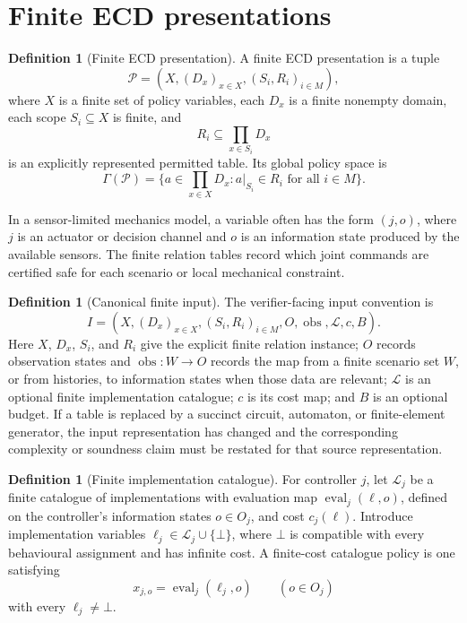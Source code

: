 \documentclass[11pt]{article}
\theoremstyle{plain}
\theoremstyle{definition}
\newtheorem{definition}[theorem]{Definition}
\theoremstyle{remark}
\begin{document}
\section{Finite ECD presentations}
\label{sec:finite-presentations}

\begin{definition}[Finite ECD presentation]
A finite ECD presentation is a tuple
\[
  \mathcal P=(X,(D_x)_{x\in X},(S_i,R_i)_{i\in M}),
\]
where \(X\) is a finite set of policy variables, each \(D_x\) is a finite
nonempty domain, each scope \(S_i\subseteq X\) is finite, and
\[
  R_i\subseteq\prod_{x\in S_i}D_x
\]
is an explicitly represented permitted table.  Its global policy space is
\[
  \Gamma(\mathcal P)=
  \{a\in\prod_{x\in X}D_x: a|_{S_i}\in R_i\text{ for all }i\in M\}.
\]
\end{definition}

In a sensor-limited mechanics model, a variable often has the form \((j,o)\),
where \(j\) is an actuator or decision channel and \(o\) is an information state
produced by the available sensors.  The finite relation tables record which
joint commands are certified safe for each scenario or local mechanical
constraint.

\begin{definition}[Canonical finite input]
\label{def:canonical-input}
The verifier-facing input convention is
\[
I=(X,(D_x)_{x\in X},(S_i,R_i)_{i\in M},O,\operatorname{obs},
\mathcal L,c,B).
\]
Here \(X\), \(D_x\), \(S_i\), and \(R_i\) give the explicit finite relation
instance; \(O\) records observation states and
\(\operatorname{obs}:W\to O\) records the map from a finite scenario set \(W\),
or from histories, to information states when those data are relevant;
\(\mathcal L\) is an optional finite implementation catalogue; \(c\) is its cost
map; and \(B\) is an optional budget.  If a table is replaced by a succinct
circuit, automaton, or finite-element generator, the input representation has
changed and the corresponding complexity or soundness claim must be restated for
that source representation.
\end{definition}

\begin{definition}[Finite implementation catalogue]
For controller \(j\), let \(\mathcal L_j\) be a finite catalogue of
implementations with evaluation map \(\operatorname{eval}_j(\ell,o)\), defined
on the controller's information states \(o\in O_j\), and cost \(c_j(\ell)\).  Introduce implementation variables
\(\ell_j\in\mathcal L_j\cup\{\bot\}\), where \(\bot\) is compatible with every
behavioural assignment and has infinite cost.  A finite-cost catalogue policy is
one satisfying
\[
  x_{j,o}=\operatorname{eval}_j(\ell_j,o)
  \qquad(o\in O_j)
\]
with every \(\ell_j\ne\bot\).
\end{definition}
\end{document}
